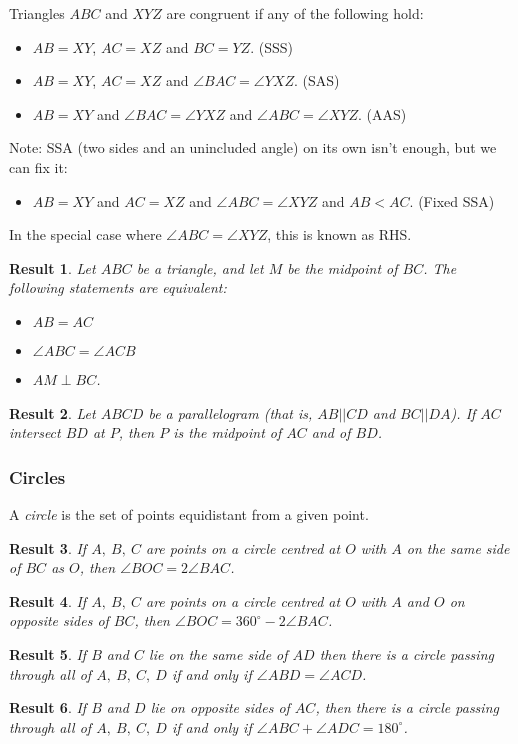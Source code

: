 \documentclass{amsart}
\newtheorem{result}{Result}[subsubsection]
\begin{document}
Triangles $ABC$ and $XYZ$ are congruent if any of the following hold:
\begin{itemize}
  \item $AB=XY$, $AC=XZ$ and $BC=YZ$. (SSS)
  \item $AB=XY$, $AC=XZ$ and $\angle BAC=\angle YXZ$. (SAS)
  \item $AB=XY$ and $\angle BAC=\angle YXZ$ and $\angle ABC=\angle XYZ$. (AAS)
\end{itemize}
Note: SSA (two sides and an unincluded angle) on its own isn't enough, but we
can fix it:
\begin{itemize}
  \item $AB=XY$ and $AC=XZ$ and $\angle ABC=\angle XYZ$ and $AB<AC$. (Fixed SSA)
\end{itemize}
In the special case where $\angle ABC=\angle XYZ$, this is known as RHS.\@
\begin{result}{\label{r:b:g:c:1}}
  Let $ABC$ be a triangle, and let $M$ be the midpoint of $BC$.
  The following statements are equivalent:
  \begin{itemize}
    \item $AB=AC$
    \item $\angle ABC=\angle ACB$
    \item $AM\perp BC$.
  \end{itemize}
\end{result}
\begin{result}{\label{r:b:g:c:2}}
  Let $ABCD$ be a parallelogram (that is, $AB||CD$ and $BC||DA$). If $AC$
  intersect $BD$ at $P$, then $P$ is the midpoint of $AC$ and of $BD$.
\end{result}
\subsubsection{Circles}
A \emph{circle} is the set of points equidistant from a given point.
\begin{result}{\label{r:b:g:ci:1}}
  If $A,\ B,\ C$ are points on a circle centred at $O$ with $A$ on the same side
  of $BC$ as $O$, then $\angle BOC=2\angle BAC$.
\end{result}
\begin{result}{\label{r:b:g:ci:2}}
  If $A,\ B,\ C$ are points on a circle centred at $O$ with $A$ and $O$ on
  opposite sides of $BC$, then $\angle BOC=360^\circ-2\angle BAC$.
\end{result}
\begin{result}{\label{r:b:g:ci:3}}
  If $B$ and $C$ lie on the same side of $AD$ then there is a circle passing
  through all of $A,\ B,\ C,\ D$ if and only if $\angle ABD=\angle ACD$.
\end{result}
\begin{result}{\label{r:b:g:ci:4}}
  If $B$ and $D$ lie on opposite sides of $AC$, then there is a circle passing
  through all of $A,\ B,\ C,\ D$ if and only if $\angle ABC+\angle
  ADC=180^\circ$.
\end{result}
\end{document}
